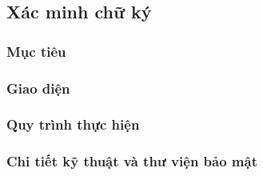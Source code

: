 \newpage
\subsection{Xác minh chữ ký}
\subsubsection*{Mục tiêu}

\subsubsection*{Giao diện}

\subsubsection*{Quy trình thực hiện}

\subsubsection*{Chi tiết kỹ thuật và thư viện bảo mật}